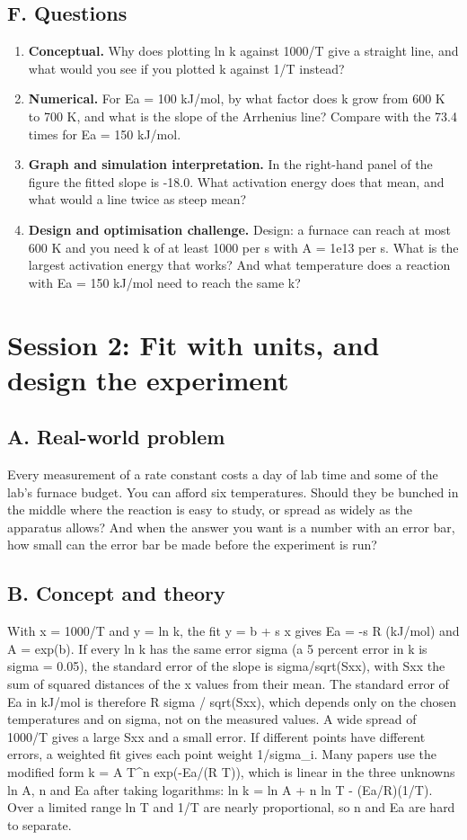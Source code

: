 \documentclass[11pt,a4paper]{article}
\begin{document}
\subsection*{F. Questions}
\begin{enumerate}[nosep]
\item \textbf{Conceptual.} Why does plotting ln k against 1000/T give a straight line, and what would you see if you plotted k against 1/T instead?
\item \textbf{Numerical.} For Ea = 100 kJ/mol, by what factor does k grow from 600 K to 700 K, and what is the slope of the Arrhenius line? Compare with the 73.4 times for Ea = 150 kJ/mol.
\item \textbf{Graph and simulation interpretation.} In the right-hand panel of the figure the fitted slope is -18.0. What activation energy does that mean, and what would a line twice as steep mean?
\item \textbf{Design and optimisation challenge.} Design: a furnace can reach at most 600 K and you need k of at least 1000 per s with A = 1e13 per s. What is the largest activation energy that works? And what temperature does a reaction with Ea = 150 kJ/mol need to reach the same k?
\end{enumerate}

\section{Session 2: Fit with units, and design the experiment}

\subsection*{A. Real-world problem}
Every measurement of a rate constant costs a day of lab time and some of the lab's furnace budget. You can afford six temperatures. Should they be bunched in the middle where the reaction is easy to study, or spread as widely as the apparatus allows? And when the answer you want is a number with an error bar, how small can the error bar be made before the experiment is run?

\subsection*{B. Concept and theory}
With x = 1000/T and y = ln k, the fit y = b + s x gives Ea = -s R (kJ/mol) and A = exp(b). If every ln k has the same error sigma (a 5 percent error in k is sigma = 0.05), the standard error of the slope is sigma/sqrt(Sxx), with Sxx the sum of squared distances of the x values from their mean. The standard error of Ea in kJ/mol is therefore R sigma / sqrt(Sxx), which depends only on the chosen temperatures and on sigma, not on the measured values. A wide spread of 1000/T gives a large Sxx and a small error. If different points have different errors, a weighted fit gives each point weight 1/sigma\_i. Many papers use the modified form k = A T\textasciicircum{}n exp(-Ea/(R T)), which is linear in the three unknowns ln A, n and Ea after taking logarithms: ln k = ln A + n ln T - (Ea/R)(1/T). Over a limited range ln T and 1/T are nearly proportional, so n and Ea are hard to separate.
\end{document}
